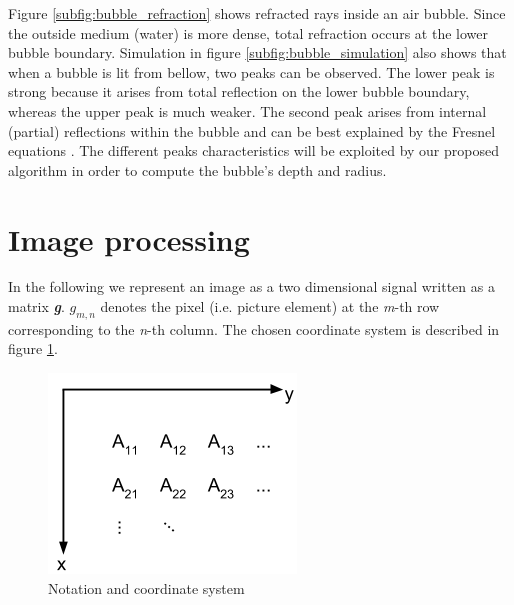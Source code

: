 			Figure \ref{subfig:bubble_refraction} shows refracted rays inside an air bubble. Since the outside medium (water) is more dense, total refraction occurs at the lower bubble boundary. Simulation in figure \ref{subfig:bubble_simulation} also shows that when a bubble is lit from bellow, two peaks can be observed. The lower peak is strong because it arises from total reflection on the lower bubble boundary, whereas the upper peak is much weaker. The second peak arises from internal (partial) reflections within the bubble and can be best explained by the Fresnel equations \citep{Demtroeder2}. 
			The different peaks characteristics will be exploited by our proposed algorithm in order to compute the bubble's depth and radius.
			
			
	
	\section{Image processing}	\label{image_processing}
	In the following we represent an image as a two dimensional signal written as a matrix \textit{\textbf{g}}. $g_{m,n}$ denotes the pixel (i.e. picture element) at the \textit{m}-th row corresponding to the \textit{n}-th column. The chosen coordinate system is described in figure \ref{fig:coord_sys}. 
	
		\begin{figure}
		    \centering
		    \includegraphics[scale=0.4]{images/coord_sys.png}
		    \caption{Notation and coordinate system}
		    \label{fig:coord_sys}
		\end{figure}
	
